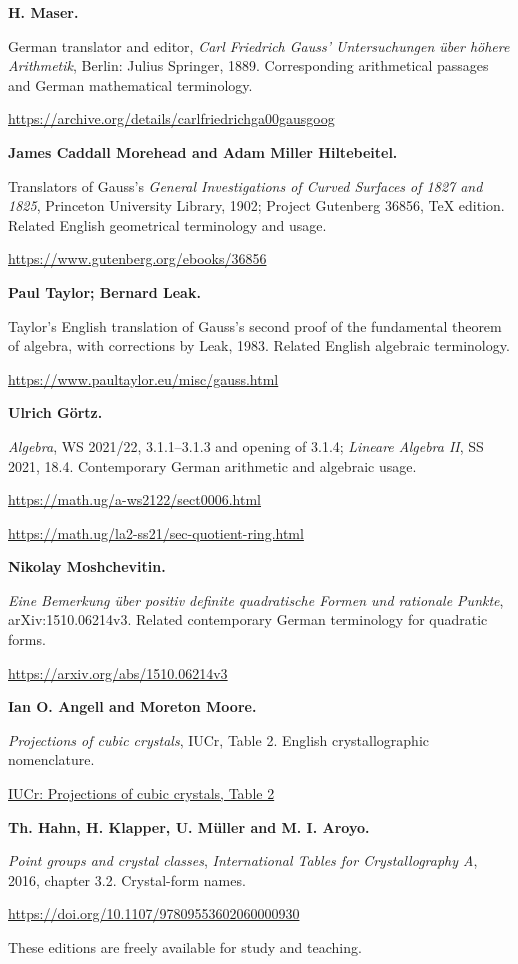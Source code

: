 \par\medskip\noindent\textbf{H. Maser.}\par\nobreak\smallskip\noindent German translator and editor, \emph{Carl Friedrich Gauss' Untersuchungen über höhere Arithmetik}, Berlin: Julius Springer, 1889. Corresponding arithmetical passages and German mathematical terminology.\par
\url{https://archive.org/details/carlfriedrichga00gausgoog}
\par\medskip\noindent\textbf{James Caddall Morehead and Adam Miller Hiltebeitel.}\par\nobreak\smallskip\noindent Translators of Gauss's \emph{General Investigations of Curved Surfaces of 1827 and 1825}, Princeton University Library, 1902; Project Gutenberg 36856, TeX edition. Related English geometrical terminology and usage.\par
\url{https://www.gutenberg.org/ebooks/36856}
\par\medskip\noindent\textbf{Paul Taylor; Bernard Leak.}\par\nobreak\smallskip\noindent Taylor's English translation of Gauss's second proof of the fundamental theorem of algebra, with corrections by Leak, 1983. Related English algebraic terminology.\par
\url{https://www.paultaylor.eu/misc/gauss.html}
\par\medskip\noindent\textbf{Ulrich Görtz.}\par\nobreak\smallskip\noindent \emph{Algebra}, WS 2021/22, 3.1.1–3.1.3 and opening of 3.1.4; \emph{Lineare Algebra II}, SS 2021, 18.4. Contemporary German arithmetic and algebraic usage.\par
\url{https://math.ug/a-ws2122/sect0006.html}\par
\url{https://math.ug/la2-ss21/sec-quotient-ring.html}
\par\medskip\noindent\textbf{Nikolay Moshchevitin.}\par\nobreak\smallskip\noindent \emph{Eine Bemerkung über positiv definite quadratische Formen und rationale Punkte}, arXiv:1510.06214v3. Related contemporary German terminology for quadratic forms.\par
\url{https://arxiv.org/abs/1510.06214v3}
\par\medskip\noindent\textbf{Ian O. Angell and Moreton Moore.}\par\nobreak\smallskip\noindent \emph{Projections of cubic crystals}, IUCr, Table 2. English crystallographic nomenclature.\par
\href{https://www.iucr.org/what-we-do/education/pamphlets/projections-of-cubic-crystals}{IUCr: Projections of cubic crystals, Table 2}
\par\medskip\noindent\textbf{Th. Hahn, H. Klapper, U. Müller and M. I. Aroyo.}\par\nobreak\smallskip\noindent \emph{Point groups and crystal classes}, \emph{International Tables for Crystallography A}, 2016, chapter 3.2. Crystal-form names.\par
\url{https://doi.org/10.1107/97809553602060000930}


\par These editions are freely available for study and teaching.\par

\clearpage\endgroup\clearpage
\setcounter{page}{\the\SavedTranslationPage}
\hypersetup{pageanchor=true}
